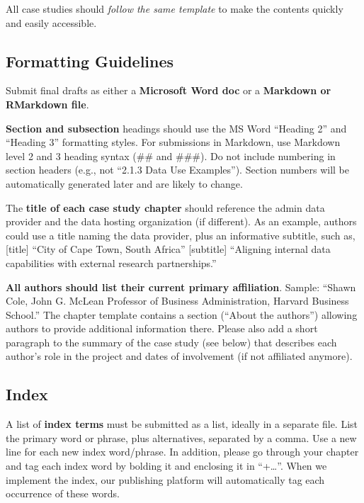 \documentclass[
]{book}
\begin{document}
All case studies should \emph{follow the same template} to make the contents quickly and easily accessible.

\hypertarget{formatting-guidelines}{%
\subsection*{Formatting Guidelines}\label{formatting-guidelines}}

Submit final drafts as either a \textbf{Microsoft Word doc} or a \textbf{Markdown or RMarkdown file}.

\textbf{Section and subsection} headings should use the MS Word ``Heading 2'' and ``Heading 3'' formatting styles. For submissions in Markdown, use Markdown level 2 and 3 heading syntax (\#\# and \#\#\#). Do not include numbering in section headers (e.g., not ``2.1.3 Data Use Examples''). Section numbers will be automatically generated later and are likely to change.

The \textbf{title of each case study chapter} should reference the admin data provider and the data hosting organization (if different). As an example, authors could use a title naming the data provider, plus an informative subtitle, such as, {[}title{]} ``City of Cape Town, South Africa'' {[}subtitle{]} ``Aligning internal data capabilities with external research partnerships.''

\textbf{All authors should list their current primary affiliation}. Sample: ``Shawn Cole, John G. McLean Professor of Business Administration, Harvard Business School.'' The chapter template contains a section (``About the authors'') allowing authors to provide additional information there. Please also add a short paragraph to the summary of the case study (see below) that describes each author's role in the project and dates of involvement (if not affiliated anymore).

\hypertarget{index}{%
\subsection*{Index}\label{index}}

A list of \textbf{index terms} must be submitted as a list, ideally in a separate file. List the primary word or phrase, plus alternatives, separated by a comma. Use a new line for each new index word/phrase. In addition, please go through your chapter and tag each index word by bolding it and enclosing it in ``+\ldots\textbar{}''. When we implement the index, our publishing platform will automatically tag each occurrence of these words.
\end{document}
